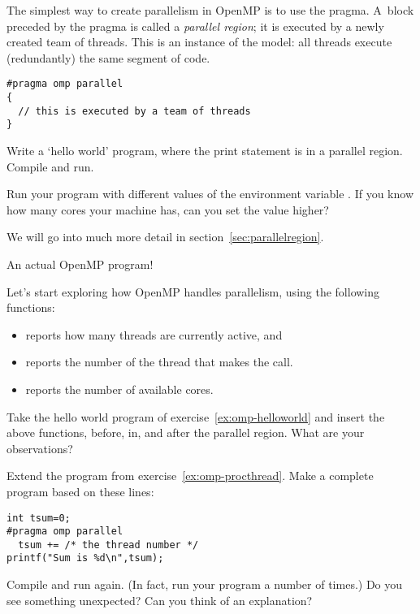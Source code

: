 The simplest way to create parallelism in OpenMP is to use
the  pragma. A~block preceded by the  pragma
is called a \emph{parallel region}; it
is executed by a newly created team of threads. 
This is an instance of the  model:
all threads execute (redundantly) the same segment of code.
\begin{lstlisting}
#pragma omp parallel
{
  // this is executed by a team of threads
}
\end{lstlisting}

\begin{exercise}
  \label{ex:omp-helloworld}
  Write a `hello world' program, where the
  print statement is in a parallel region.
  Compile and run.

  Run your program with different values of the environment variable
  .
  If you know how many cores your machine has,
  can you set the value higher?
\end{exercise}

We will go into much more detail in section~\ref{sec:parallelregion}.

 {An actual OpenMP program!}

Let's start exploring how OpenMP handles parallelism,
using the following functions:
\begin{itemize}
\item {} reports how many threads are
  currently active, and
\item {} reports the number of the
  thread that makes the call.
\item {} reports the number of available
  cores.
\end{itemize}

\begin{exercise}
  \label{ex:omp-procthread}
  Take the hello world program of exercise~\ref{ex:omp-helloworld}
  and insert the above functions, before, in, and after the parallel region.
  What are your observations?
\end{exercise}

\begin{exercise}
  \label{ex:omp-procthreadn}
  Extend the program from exercise~\ref{ex:omp-procthread}. Make a
  complete program based on these lines:
\begin{lstlisting}
int tsum=0;
#pragma omp parallel
  tsum += /* the thread number */
printf("Sum is %d\n",tsum);
\end{lstlisting}
Compile and run again. (In fact, run your program a number of times.)
Do you see something unexpected? Can you think
of an explanation?
\end{exercise}

